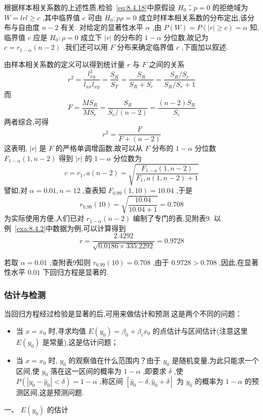 根据样本相关系数的上述性质,检验~\ref{eq:8.4.18}中原假设 $ H_0：p=0 $ 的拒绝域为
$ W={lrl\ge c} $ ,其中临界值 $ c $ 可由 $ H_0:p\rho =0 $ 成立时样本相关系数的分布定出,该分布与自由度 $ n-2 $ 有关.
对给定的显著性水平 $ \alpha $ ,由 $ P(W)=P(|r|\ge c)=\alpha $ 知,临界值 $ c $ 应是 $ H_0:\rho =0 $ 成立下 $ |r| $ 的分布的 $ 1-\alpha $ 分位数,故记为 $ c=r_{1-\alpha}(n-2) $ .我们还可以用 $ F $ 分布来确定临界值 $ c $ ,下面加以叙述.

由样本相关系数的定义可以得到统计量 $ r $ 与 $ F $ 之间的关系
\[
r^{2} =\frac{l_{x y}^{2}}{l_{x x} l_{x y}}=\frac{S_{R}}{S_{T}}=\frac{S_{R}}{S_{R}+S_{e}}=\frac{S_{R} / S_{e}}{S_{R} / S_{e}+1} 
\]
而
\[
F=\frac{MS_R}{MS_e}=\frac{S_R}{S_e/\left( n-2 \right)}=\frac{\left( n-2 \right) S_R}{S_e}
\]
两者综合,可得
\[
r^2=\frac{F}{F+(n-2)}	
\]
这表明, $ |r| $ 是 $ F $ 的严格单调增函数,故可以从 $ F $ 分布的 $ 1-\alpha $ 分位数 $ F_{1-\alpha}(1,n-2) $ 得到 $ |r| $ 的 $ 1-\alpha $ 分位数为
\[
c=r_{1}, a(n-2)=\sqrt{\frac{F_{1-a}(1, n-2)}{F_{1}, a(1, n-2)+1}}
\]
譬如,对 $ \alpha =0.01,n=12 $ ,查表知 $ F_{0.99}(1,10)=10.04 $ ,于是
\[
r_{0.99}(10)=\sqrt{\frac{10.04}{10.04+1}}=0.708
\]
为实际使用方便,人们已对 $ r_{1-\alpha}(n-2) $ 编制了专门的表,见附表9.
以例~\ref{exa:8.4.2}中数据为例,可以计算得到
\[
r=\frac{2.4292}{\sqrt{0.0186 \times 335.2292}}=0.9728
\]

若取 $ \alpha =0.01 $ ,查附表9知则 $ r_{0.99}(10)=0.708 $ ,由于 $ 0.9728>0.708 $ ,因此,在显著性水平 $ 0.01 $ 下回归方程是显著的.


\subsubsection{估计与检测}\label{sec:8.4.5}

当回归方程经过检验是显著的后,可用来做估计和预测.这是两个不同的问题：
\begin{itemize}
	\item 当 $ x=x_0 $ 时,寻求均值 $ E(y_0)=\beta_0+\beta_ix_0 $ 的点估计与区间估计(注意这里 $ E(y_0) $ 是常量),这是估计问题；
	\item 当 $ x=x_0 $ 时, $ y_0 $ 的观察值在什么范围内？由于 $ y_0 $ 是随机变量,为此只能求一个区间,使 $ y_0 $ 落在这一区间的概率为 $ 1-\alpha $ ,即要求 $ \delta $ ,使 $ P(|y_0-\hat{y}_0|<\delta)=1-\alpha $ ,称区间 $\left[\hat{y}_{0}-\delta, \hat{y}_{0}+\delta\right]$ 为 $ y_0 $ 的概率为 $ 1-\alpha $ 的预测区间,这是预测问题.
\end{itemize}

一、 $ E(y_0) $ 的估计

